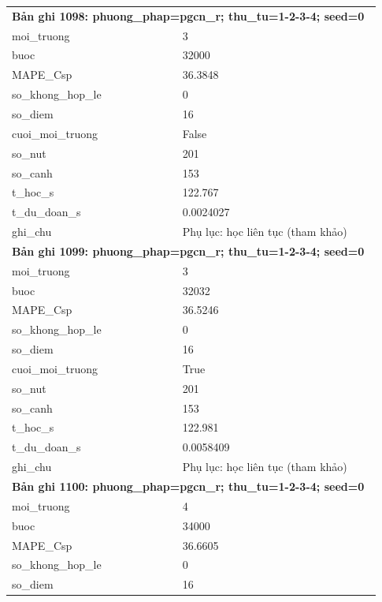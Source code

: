 \begin{longtable}{p{0.43\linewidth}p{0.50\linewidth}}
\midrule
\multicolumn{2}{p{0.95\linewidth}}{\textbf{Bản ghi 1098: phuong\_phap=pgcn\_r; thu\_tu=1-2-3-4; seed=0}} \\
moi\_\allowbreak truong & 3 \\
buoc & 32000 \\
MAPE\_\allowbreak Csp & 36.3848 \\
so\_\allowbreak khong\_\allowbreak hop\_\allowbreak le & 0 \\
so\_\allowbreak diem & 16 \\
cuoi\_\allowbreak moi\_\allowbreak truong & False \\
so\_\allowbreak nut & 201 \\
so\_\allowbreak canh & 153 \\
t\_\allowbreak hoc\_\allowbreak s & 122.767 \\
t\_\allowbreak du\_\allowbreak doan\_\allowbreak s & 0.0024027 \\
ghi\_\allowbreak chu & Phụ lục: học liên tục (tham khảo) \\
\midrule
\multicolumn{2}{p{0.95\linewidth}}{\textbf{Bản ghi 1099: phuong\_phap=pgcn\_r; thu\_tu=1-2-3-4; seed=0}} \\
moi\_\allowbreak truong & 3 \\
buoc & 32032 \\
MAPE\_\allowbreak Csp & 36.5246 \\
so\_\allowbreak khong\_\allowbreak hop\_\allowbreak le & 0 \\
so\_\allowbreak diem & 16 \\
cuoi\_\allowbreak moi\_\allowbreak truong & True \\
so\_\allowbreak nut & 201 \\
so\_\allowbreak canh & 153 \\
t\_\allowbreak hoc\_\allowbreak s & 122.981 \\
t\_\allowbreak du\_\allowbreak doan\_\allowbreak s & 0.0058409 \\
ghi\_\allowbreak chu & Phụ lục: học liên tục (tham khảo) \\
\midrule
\multicolumn{2}{p{0.95\linewidth}}{\textbf{Bản ghi 1100: phuong\_phap=pgcn\_r; thu\_tu=1-2-3-4; seed=0}} \\
moi\_\allowbreak truong & 4 \\
buoc & 34000 \\
MAPE\_\allowbreak Csp & 36.6605 \\
so\_\allowbreak khong\_\allowbreak hop\_\allowbreak le & 0 \\
so\_\allowbreak diem & 16 \\

\end{longtable}
